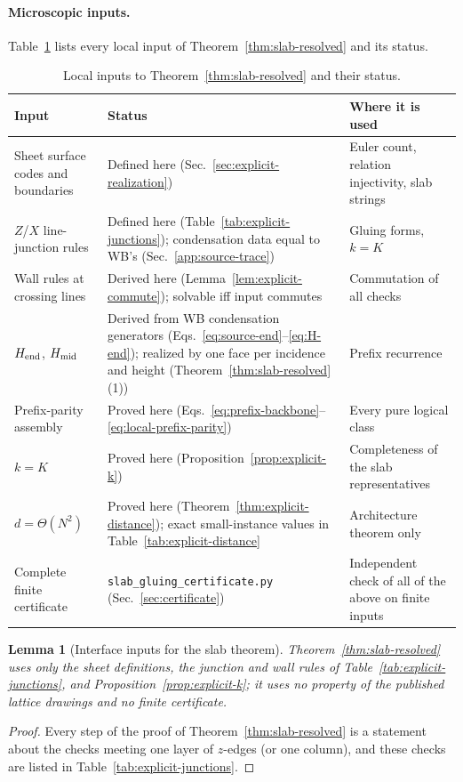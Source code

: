 \documentclass[aps,prx,reprint,superscriptaddress,nofootinbib,floatfix,longbibliography]{revtex4-2}
\newtheorem{lemma}[theorem]{Lemma}
\theoremstyle{definition}
\begin{document}
\paragraph{Microscopic inputs.}
Table~\ref{tab:slab-inputs} lists every local input of
Theorem~\ref{thm:slab-resolved} and its status.

\begin{table}[t]
\caption{Local inputs to Theorem~\ref{thm:slab-resolved} and their status.}
\label{tab:slab-inputs}
\scriptsize
\setlength{\tabcolsep}{3.0pt}
\renewcommand{\arraystretch}{1.18}
\begin{tabular}{@{}p{3.6cm}p{5.2cm}p{7.2cm}@{}}
\toprule
Input & Status & Where it is used \\
\midrule
Sheet surface codes and boundaries & Defined here (Sec.~\ref{sec:explicit-realization}) & Euler count, relation injectivity, slab strings \\
$Z$/$X$ line-junction rules & Defined here (Table~\ref{tab:explicit-junctions}); condensation data equal to WB's (Sec.~\ref{app:source-trace}) & Gluing forms, $k=K$ \\
Wall rules at crossing lines & Derived here (Lemma~\ref{lem:explicit-commute}); solvable iff input commutes & Commutation of all checks \\
$H_{\rm end}$, $H_{\rm mid}$ & Derived from WB condensation generators (Eqs.~\eqref{eq:source-end}--\eqref{eq:H-end}); realized by one face per incidence and height (Theorem~\ref{thm:slab-resolved}(1)) & Prefix recurrence \\
Prefix-parity assembly & Proved here (Eqs.~\eqref{eq:prefix-backbone}--\eqref{eq:local-prefix-parity}) & Every pure logical class \\
$k=K$ & Proved here (Proposition~\ref{prop:explicit-k}) & Completeness of the slab representatives \\
$d=\Theta(N^2)$ & Proved here (Theorem~\ref{thm:explicit-distance}); exact small-instance values in Table~\ref{tab:explicit-distance} & Architecture theorem only \\
Complete finite certificate & \texttt{slab\_gluing\_certificate.py} (Sec.~\ref{sec:certificate}) & Independent check of all of the above on finite inputs \\
\bottomrule
\end{tabular}
\end{table}

\begin{lemma}[Interface inputs for the slab theorem]
\label{lem:interface-completeness}
Theorem~\ref{thm:slab-resolved} uses only the sheet definitions, the
junction and wall rules of Table~\ref{tab:explicit-junctions}, and
Proposition~\ref{prop:explicit-k}; it uses no property of the published
lattice drawings and no finite certificate.
\end{lemma}
\begin{proof}
Every step of the proof of Theorem~\ref{thm:slab-resolved} is a statement
about the checks meeting one layer of $z$-edges (or one column), and these
checks are listed in Table~\ref{tab:explicit-junctions}.
\end{proof}
\end{document}
